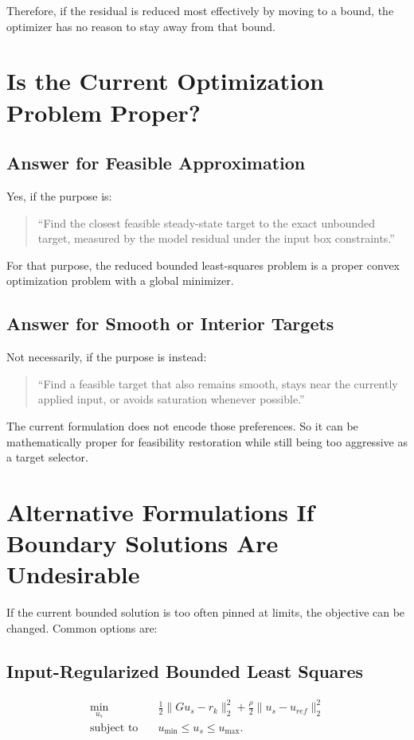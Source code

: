 \documentclass[11pt]{article}
\begin{document}
Therefore, if the residual is reduced most effectively by moving to a bound, the optimizer has no reason to stay away from that bound.

\section{Is the Current Optimization Problem Proper?}

\subsection{Answer for Feasible Approximation}

Yes, if the purpose is:
\begin{quote}
``Find the closest feasible steady-state target to the exact unbounded target, measured by the model residual under the input box constraints.''
\end{quote}
For that purpose, the reduced bounded least-squares problem is a proper convex optimization problem with a global minimizer.

\subsection{Answer for Smooth or Interior Targets}

Not necessarily, if the purpose is instead:
\begin{quote}
``Find a feasible target that also remains smooth, stays near the currently applied input, or avoids saturation whenever possible.''
\end{quote}
The current formulation does not encode those preferences. So it can be mathematically proper for feasibility restoration while still being too aggressive as a target selector.

\section{Alternative Formulations If Boundary Solutions Are Undesirable}

If the current bounded solution is too often pinned at limits, the objective can be changed. Common options are:

\subsection{Input-Regularized Bounded Least Squares}

\begin{align}
\min_{u_s} \quad &
\frac{1}{2}\|Gu_s-r_k\|_2^2
+
\frac{\rho}{2}\|u_s-u_{ref}\|_2^2 \\
\text{subject to} \quad & u_{\min} \le u_s \le u_{\max}.
\end{align}
\end{document}
